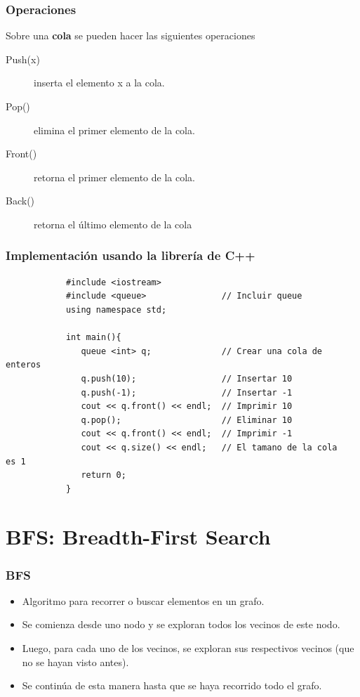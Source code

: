 \documentclass{beamer}
\begin{document}
	\begin{frame}
		\frametitle{Operaciones}
		Sobre una \textbf{cola} se pueden hacer las siguientes
operaciones
		\begin{description}
			\item[Push(x)] inserta el elemento x a la cola.
			\item[Pop()] elimina el primer elemento de la cola.
			\item[Front()] retorna el primer elemento de la cola.
			\item[Back()] retorna el último elemento de la cola
		\end{description}
	\end{frame}

	\begin{frame}[fragile]
		\frametitle{Implementación usando la librería de C++}
		\begin{lstlisting}
			#include <iostream>
			#include <queue>               // Incluir queue
			using namespace std;

			int main(){
			   queue <int> q;              // Crear una cola de
enteros
			   q.push(10);                 // Insertar 10
			   q.push(-1);                 // Insertar -1
			   cout << q.front() << endl;  // Imprimir 10
			   q.pop();                    // Eliminar 10
			   cout << q.front() << endl;  // Imprimir -1
			   cout << q.size() << endl;   // El tamano de la cola
es 1
			   return 0;
			}
		\end{lstlisting}
	\end{frame}

\section{BFS: Breadth-First Search}
	\begin{frame}
		\frametitle{BFS}
		\begin{itemize}
			\item Algoritmo para recorrer o buscar elementos en un
grafo.
			\item Se comienza desde uno nodo y se exploran todos los
vecinos de este nodo.
			\item Luego, para cada uno de los vecinos, se exploran
sus respectivos vecinos (que no se hayan visto antes).
			\item Se continúa de esta manera hasta que se haya
recorrido todo el grafo.
		\end{itemize}
	\end{frame}
\end{document}
